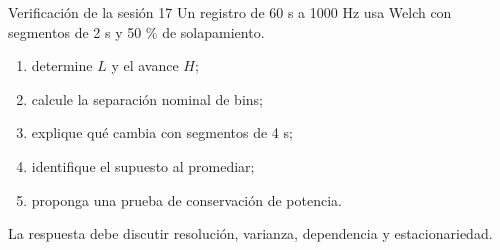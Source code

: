\documentclass[
  ignorenonframetext,
  aspectratio=169,
  spanish,
]{beamer}
\providecommand{\tightlist}{%
  \setlength{\itemsep}{0pt}\setlength{\parskip}{0pt}}
\begin{document}
\begin{frame}{Verificación de la sesión 17}
  \protect{}\label{verificaciuxf3n-de-la-sesiuxf3n-17}
  Un registro de 60 s a 1000 Hz usa Welch con segmentos de 2 s y 50 \% de
  solapamiento.

  \begin{enumerate}
    \tightlist
    \item
          determine \(L\) y el avance \(H\);
    \item
          calcule la separación nominal de bins;
    \item
          explique qué cambia con segmentos de 4 s;
    \item
          identifique el supuesto al promediar;
    \item
          proponga una prueba de conservación de potencia.
  \end{enumerate}

  \begin{tcolorbox}[enhanced jigsaw, arc=.35mm, bottomrule=.15mm, bottomtitle=1mm, breakable, colback=white, colbacktitle=quarto-callout-tip-color!10!white, colframe=quarto-callout-tip-color-frame, coltitle=black, left=2mm, leftrule=.75mm, opacityback=0, opacitybacktitle=0.6, rightrule=.15mm, title=\textcolor{quarto-callout-tip-color}{\faLightbulb}\hspace{0.5em}{Criterio de logro}, titlerule=0mm, toprule=.15mm, toptitle=1mm]

    La respuesta debe discutir resolución, varianza, dependencia y
    estacionariedad.

  \end{tcolorbox}
\end{frame}
\end{document}
